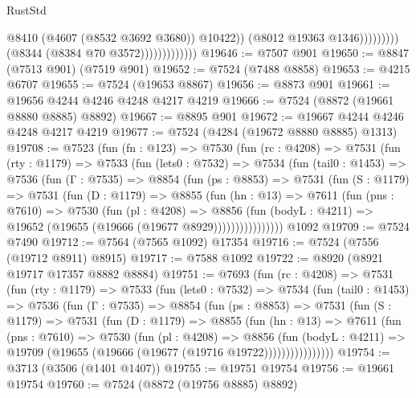 \begin{lexlean}{RustStd}
\begin{coremodule}
                                              @8410
                                              (@4607 (@8532 @3692 @3680))
                                              @10422))
                                          (@8012 @19363 @1346)))))))))
                          (@8344 (@8384 @70 @3572)))))))))))))
@19646 := @7507 @901
@19650 := @8847 (@7513 @901) (@7519 @901)
@19652 := @7524 (@7488 @8858)
@19653 := @4215 @6707
@19655 := @7524 (@19653 @8867)
@19656 := @8873 @901
@19661 := @19656 @4244 @4246 @4248 @4217 @4219
@19666 := @7524 (@8872 (@19661 @8880 @8885) @8892)
@19667 := @8895 @901
@19672 := @19667 @4244 @4246 @4248 @4217 @4219
@19677 := @7524 (@4284 (@19672 @8880 @8885) @1313)
@19708 := @7523
    (fun (fn : @123) =>
    @7530
      (fun (rc : @4208) =>
      @7531
        (fun (rty : @1179) =>
        @7533
          (fun (lets0 : @7532) =>
          @7534
            (fun (tail0 : @1453) =>
            @7536
              (fun (Γ : @7535) =>
              @8854
                (fun (ps : @8853) =>
                @7531
                  (fun (S : @1179) =>
                  @7531
                    (fun (D : @1179) =>
                    @8855
                      (fun (hn : @13) =>
                      @7611
                        (fun (pns : @7610) =>
                        @7530
                          (fun (pl : @4208) =>
                          @8856
                            (fun (bodyL : @4211) =>
                            @19652 (@19655 (@19666 (@19677 @8929))))))))))))))))
    @1092
@19709 := @7524 @7490
@19712 := @7564 (@7565 @1092) @17354
@19716 := @7524 (@7556 (@19712 @8911) @8915)
@19717 := @7588 @1092
@19722 := @8920 (@8921 @19717 @17357 @8882 @8884)
@19751 := @7693
    (fun (rc : @4208) =>
    @7531
      (fun (rty : @1179) =>
      @7533
        (fun (lets0 : @7532) =>
        @7534
          (fun (tail0 : @1453) =>
          @7536
            (fun (Γ : @7535) =>
            @8854
              (fun (ps : @8853) =>
              @7531
                (fun (S : @1179) =>
                @7531
                  (fun (D : @1179) =>
                  @8855
                    (fun (hn : @13) =>
                    @7611
                      (fun (pns : @7610) =>
                      @7530
                        (fun (pl : @4208) =>
                        @8856
                          (fun (bodyL : @4211) =>
                          @19709 (@19655 (@19666 (@19677 (@19716 @19722))))))))))))))))
@19754 := @3713 (@3506 (@1401 @1407))
@19755 := @19751 @19754
@19756 := @19661 @19754
@19760 := @7524 (@8872 (@19756 @8885) @8892)

\end{coremodule}
\end{lexlean}
